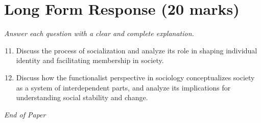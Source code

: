 \documentclass[12pt]{article}
\begin{document}
\section*{Long Form Response (20 marks)}
\textit{Answer each question with a clear and complete explanation.}
\begin{enumerate}[label=\arabic*.]
\setcounter{enumi}{10}
\item Discuss the process of socialization and analyze its role in shaping individual identity and facilitating membership in society.
\item Discuss how the functionalist perspective in sociology conceptualizes society as a system of interdependent parts, and analyze its implications for understanding social stability and change.
\end{enumerate}

\vfill
\noindent\textit{End of Paper}
\end{document}
